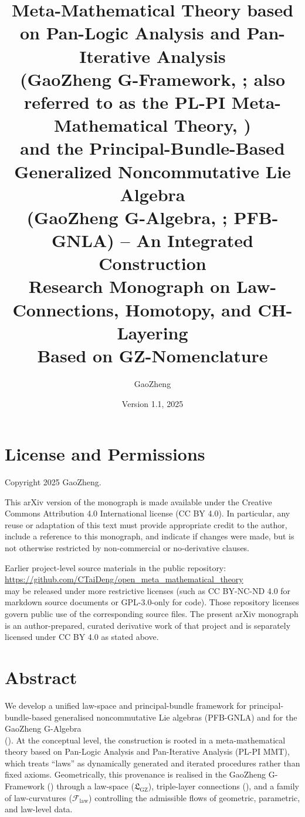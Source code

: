 \documentclass[11pt]{book}
\title{\textbf{Meta-Mathematical Theory based on Pan-Logic Analysis and Pan-Iterative Analysis\\[0.3em]
(GaoZheng G-Framework, \GFramework; also referred to as the PL-PI Meta-Mathematical Theory, \PLPIMMT)\\[0.8em]
and the Principal-Bundle-Based Generalized Noncommutative Lie Algebra\\[0.3em]
(GaoZheng G-Algebra, \GAlgebra; PFB-GNLA) -- An Integrated Construction\\[0.8em]
\large
Research Monograph on Law-Connections, Homotopy, and CH-Layering\\[0.3em]
Based on GZ-Nomenclature
}}
\author{GaoZheng}
\date{Version 1.1, 2025}
\theoremstyle{plain}
\theoremstyle{definition}
\newcommand{\GFramework}{\text{G-Framework}} \newcommand{\GAlgebra}{\text{G-Algebra}}
\newcommand{\GZLS}{\ensuremath{\mathfrak{L}_{\mathrm{GZ}}}}       \newcommand{\GZLT}{\ensuremath{M_{!w}}}                           \newcommand{\GZLOC}{\ensuremath{A_M}}                             \newcommand{\GZLCurv}{\ensuremath{\mathcal{F}_{\mathrm{law}}}}
\begin{document}
\maketitle



\frontmatter

\chapter*{License and Permissions}


Copyright \textcopyright{} 2025 GaoZheng.

This arXiv version of the monograph is made available under the
Creative Commons Attribution 4.0 International license (CC BY 4.0).
In particular, any reuse or adaptation of this text must provide
appropriate credit to the author, include a reference to this
monograph, and indicate if changes were made, but is not otherwise
restricted by non-commercial or no-derivative clauses.

Earlier project-level source materials in the public repository: \\
\url{https://github.com/CTaiDeng/open_meta_mathematical_theory} \\
may be released under more restrictive licenses (such as
CC BY-NC-ND 4.0 for markdown source documents or GPL-3.0-only for
code). Those repository licenses govern public use of the
corresponding source files. The present arXiv monograph is an
author-prepared, curated derivative work of that project and is
separately licensed under CC BY 4.0 as stated above.


\chapter*{Abstract}


We develop a unified law-space and principal-bundle framework for
principal-bundle-based generalised noncommutative Lie algebras
(PFB-GNLA) and for the GaoZheng G-Algebra \\(\GAlgebra). At the
conceptual level, the construction is rooted in a meta-mathematical
theory based on Pan-Logic Analysis and Pan-Iterative Analysis
(PL-PI MMT), which treats “laws” as dynamically generated and iterated
procedures rather than fixed axioms. Geometrically, this provenance is
realised in the GaoZheng G-Framework (\GFramework) through a law-space
(\GZLS), triple-layer connections (\GZTLC), and a family of
law-curvatures (\GZLCurv) controlling the admissible flows of geometric,
parametric, and law-level data.
\end{document}
